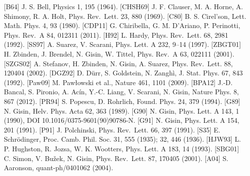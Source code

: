 \documentclass[
  11pt]{article}
\begin{document}
{[}B64{]} J. S. Bell, Physics 1, 195 (1964). {[}CHSH69{]} J. F. Clauser,
M. A. Horne, A. Shimony, R. A. Holt, Phys. Rev.~Lett. 23, 880 (1969).
{[}C80{]} B. S. Cirel'son, Lett. Math. Phys. 4, 93 (1980). {[}CDP11{]}
G. Chiribella, G. M. D'Ariano, P. Perinotti, Phys. Rev.~A 84, 012311
(2011). {[}H92{]} L. Hardy, Phys. Rev.~Lett. 68, 2981 (1992). {[}SS97{]}
A. Suarez, V. Scarani, Phys. Lett. A 232, 9--14 (1997). {[}ZBGT01{]} H.
Zbinden, J. Brendel, N. Gisin, W. Tittel, Phys. Rev.~A 63, 022111
(2001). {[}SZGS02{]} A. Stefanov, H. Zbinden, N. Gisin, A. Suarez, Phys.
Rev.~Lett. 88, 120404 (2002). {[}DGZ92{]} D. D\"urr, S. Goldstein, N.
Zangh\`i, J. Stat. Phys. 67, 843 (1992). {[}Paw09{]} M. Paw\l{}owski et al.,
Nature 461, 1101 (2009). {[}BPA12{]} J.-D. Bancal, S. Pironio, A. Ac\'in,
Y.-C. Liang, V. Scarani, N. Gisin, Nature Phys. 8, 867 (2012).
{[}PR94{]} S. Popescu, D. Rohrlich, Found. Phys. 24, 379 (1994).
{[}G89{]} N. Gisin, Helv. Phys. Acta 62, 363 (1989). {[}G90{]} N. Gisin,
Phys. Lett. A 143, 1 (1990), DOI 10.1016/0375-9601(90)90786-N. {[}G91{]}
N. Gisin, Phys. Lett. A 154, 201 (1991). {[}P91{]} J. Polchinski, Phys.
Rev.~Lett. 66, 397 (1991). {[}S35{]} E. Schr\"odinger, Proc. Camb. Phil.
Soc. 31, 555 (1935); 32, 446 (1936). {[}HJW93{]} L. P. Hughston, R.
Jozsa, W. K. Wootters, Phys. Lett. A 183, 14 (1993). {[}SBG01{]} C.
Simon, V. Bu\v{z}ek, N. Gisin, Phys. Rev.~Lett. 87, 170405 (2001). {[}A04{]}
S. Aaronson, quant-ph/0401062 (2004).
\end{document}
